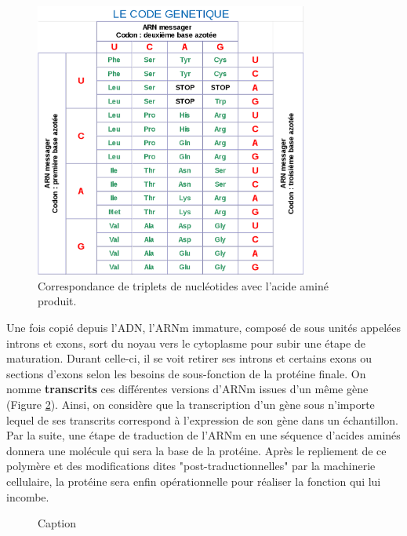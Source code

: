 \begin{figure}[!ht]
    \centering
    \includegraphics[width=0.8\textwidth]{img/intro/code_genetique.png}
    \caption{Correspondance de triplets de nucléotides avec l'acide aminé produit.}
    \label{fig:intro_code_genetique}
\end{figure}


Une fois copié depuis l'ADN, l'ARNm immature, composé de sous unités appelées introns et exons, sort du noyau vers le cytoplasme pour subir une étape de maturation. Durant celle-ci, il se voit retirer ses introns et certains exons ou sections d'exons selon les besoins de sous-fonction de la protéine finale. On nomme \textbf{transcrits} ces différentes versions d'ARNm issues d'un même gène (Figure \ref{fig:alternative_splicing}). Ainsi, on considère que la transcription d'un gène sous n'importe lequel de ses transcrits correspond à l'expression de son gène dans un échantillon. Par la suite, une étape de traduction de l'ARNm en une séquence d'acides aminés donnera une molécule qui sera la base de la protéine. Après le repliement de ce polymère et des modifications dites "post-traductionnelles" par la machinerie cellulaire, la protéine sera enfin opérationnelle pour réaliser la fonction qui lui incombe. 

\begin{figure}
    \centering
    \caption{Caption}
    \label{fig:alternative_splicing}
\end{figure}

